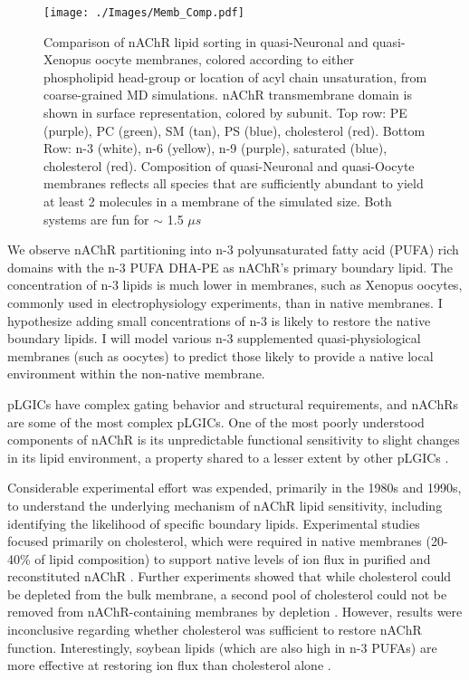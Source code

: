 \begin{figure}[t!]\center
	\texttt{[image: ./Images/Memb\_Comp.pdf]}
	\caption{Comparison of nAChR lipid sorting in quasi-Neuronal and quasi-Xenopus oocyte membranes, colored according to either phospholipid head-group or location of acyl chain unsaturation, from coarse-grained MD simulations. nAChR transmembrane domain is shown in surface representation, colored by subunit. Top row: PE (purple), PC (green), SM (tan), PS (blue), cholesterol (red). Bottom Row: n-3 (white), n-6 (yellow), n-9 (purple), saturated (blue), cholesterol (red). Composition of quasi-Neuronal and quasi-Oocyte membranes reflects all species that are sufficiently abundant to yield at least 2 molecules in a membrane of the simulated size. Both systems are fun for $\sim$ 1.5 $\mu s$}
	\label{fig:ooct}
\end{figure}

We observe nAChR partitioning into  n-3 polyunsaturated fatty acid (PUFA)  rich domains with the n-3 PUFA DHA-PE as nAChR's primary boundary lipid. The concentration of n-3 lipids is much lower in membranes, such as Xenopus oocytes,  commonly used in electrophysiology experiments, than in native membranes. I hypothesize adding small concentrations of n-3 is likely to restore the native boundary lipids. I will model various n-3 supplemented quasi-physiological membranes (such as oocytes) to predict those likely to provide a native local environment within the non-native membrane.

pLGICs have complex gating behavior and structural requirements, and nAChRs are some of the most complex pLGICs. One of the most poorly understood components of nAChR is its unpredictable functional sensitivity to slight changes in its lipid environment, a property shared to a lesser extent by other pLGICs \cite{M.CriadoH.Eibl1982,Conti2013}.

Considerable experimental effort \cite{Fong_Correlation_1986,Sunshine_Lipid_1992,Hamouda_Assessing_2006,Butler_FTIR_1993,Bhushan_Correlation_1993,Fong_Stabilization_1987,Corrie_Lipid_2002} was expended, primarily in the 1980s and 1990s, to understand the underlying mechanism of nAChR lipid sensitivity, including identifying the likelihood of specific boundary lipids. Experimental studies focused primarily on cholesterol, which were required in native membranes (20-40\% of lipid composition) to support native levels of ion flux in purified and reconstituted nAChR \cite{Fong_Correlation_1986,Fong_Stabilization_1987}. Further experiments showed that while cholesterol could be depleted from the bulk membrane, a second pool of cholesterol could not be removed from nAChR-containing membranes by depletion \cite{Leibel1987}. However, results were inconclusive regarding whether cholesterol was sufficient to restore nAChR function. Interestingly, soybean lipids (which are also high in n-3 PUFAs) \cite{Yoshida1986,Regost2003,Olsen2003} are more effective at restoring ion flux than cholesterol alone \cite{Morales2006}.

